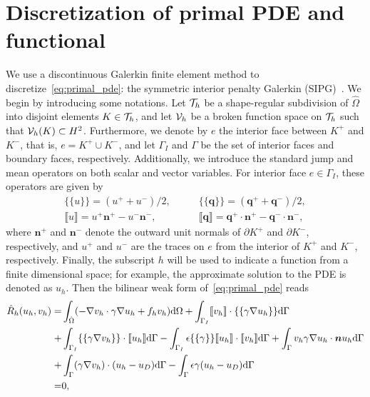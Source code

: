 \documentclass[a4paper]{article}
\begin{document}
\section{Discretization of primal PDE and functional}
We use a discontinuous Galerkin finite element method to discretize~\eqref{eq:primal_pde}: the symmetric interior penalty Galerkin (SIPG)~\cite{Shahbazi2005}. We begin by introducing some notations. Let
$\mathcal{T}_h$ be a shape-regular subdivision of $\hat{\Omega}$ into disjoint elements $K \in \mathcal{T}_h$, and let $\mathcal{V}_h$ be a broken function space on $\mathcal{T}_h$ such that $\mathcal{V}_h(K) \subset H^2$. Furthermore, we denote by $e$ the interior face between $K^+$ and $K^-$, that is, $e=K^+ \cup K^-$, and let $\Gamma_I$ and $\Gamma$ be the set of interior faces and boundary faces, respectively. Additionally, we introduce the standard jump and mean operators on both scalar and vector variables. For interior face $e\in \Gamma_{I}$, these operators are given by
\begin{equation}
\begin{aligned}
\{\{u\}\} = (u^+ + u^-)/2,   \qquad& \{\{\bm{q}\}\} = (\bm{q}^+ + \bm{q}^-)/2, \\
\llbracket u \rrbracket = u^+\bm{n}^+ - u^-\bm{n}^-, \qquad & \llbracket \bm{q}\rrbracket = \bm{q}^+\cdot \bm{n}^+ - \bm{q}^-\cdot\bm{n}^-,
\end{aligned}
\end{equation}
where $\bm{n}^+$ and $\bm{n}^-$ denote the outward unit normals of $\partial K^+$ and $\partial K^-$, respectively, and $u^+$ and $u^-$ are the traces on $e$ from the interior of $K^+$ and $K^-$, respectively. Finally, the subscript $h$ will be used to indicate a function from a finite dimensional space; for example, the approximate solution to the PDE is denoted as $u_h$.
Then the bilinear weak form of~\eqref{eq:primal_pde} reads
\begin{equation}\label{eq:disc_primal_pde}
\begin{aligned}
\hat{R}_h(u_h, v_h) =& \int_{\hat{\Omega}} (-\nabla v_h\cdot \gamma\nabla u_h + f_hv_h)\mathrm{d} \Omega
+ \int_{\Gamma_{I}}\llbracket v_h\rrbracket\cdot\{\{\gamma\nabla u_h\}\}  \mathrm{d}\Gamma \\
+& \int_{\Gamma_{I}} \{\{\gamma\nabla v_h\}\}\cdot \llbracket u_h\rrbracket \mathrm{d}\Gamma - \int_{\Gamma_{I}} \epsilon \{\{\gamma\}\}\llbracket u_h\rrbracket\cdot\llbracket v_h\rrbracket \mathrm{d}\Gamma  + \int_{\Gamma} v_h \gamma\nabla u_h\cdot \bm{n} u_h\mathrm{d}\Gamma \\
+& \int_{\Gamma} (\gamma\nabla v_h)\cdot (u_h-u_D)\mathrm{d}\Gamma - \int_{\Gamma}\epsilon \gamma (u_h - u_D) \mathrm{d}\Gamma  \\
=& 0,
\end{aligned}
\end{equation}
\end{document}

